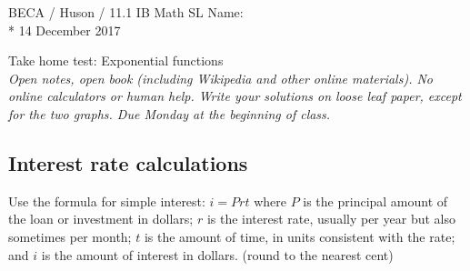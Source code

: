 \documentclass[oneside]{book}
\begin{document}
\noindent BECA / Huson / 11.1 IB Math SL \hspace{2in} Name:\\*
14 December 2017
\begin{center}
{\Large Take home test: Exponential functions} \\
\textit{Open notes, open book (including Wikipedia and other online materials). No online calculators or human help. Write your solutions on loose leaf paper, except for the two graphs. Due Monday at the beginning of class.}
\end{center}

\subsection*{Interest rate calculations}

Use the formula for simple interest: $i=Prt$ where $P$ is the principal amount of the loan or investment in dollars; $r$ is the interest rate, usually per year but also sometimes per month; $t$ is the amount of time, in units consistent with the rate; and $i$ is the amount of interest in dollars. (round to the nearest cent)
\end{document}
